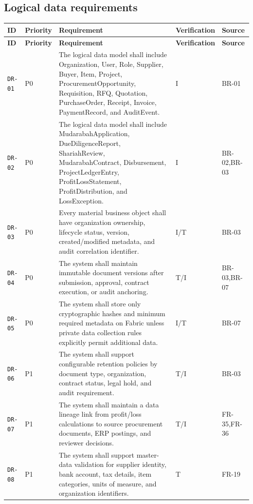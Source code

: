 \documentclass[11pt,a4paper]{article}
\begin{document}
\subsection{Logical data requirements}\label{sec:data}
\begin{footnotesize}
\begin{longtable}{@{}p{}p{}p{}p{}p{}@{}}
\rowcolor{gray!18}\textbf{ID} & \textbf{Priority} & \textbf{Requirement} & \textbf{Verification} & \textbf{Source} \\ \hline
\endfirsthead
\rowcolor{gray!18}\textbf{ID} & \textbf{Priority} & \textbf{Requirement} & \textbf{Verification} & \textbf{Source} \\ \hline
\endhead
\texttt{DR-01} & P0 & The logical data model shall include Organization, User, Role, Supplier, Buyer, Item, Project, ProcurementOpportunity, Requisition, RFQ, Quotation, PurchaseOrder, Receipt, Invoice, PaymentRecord, and AuditEvent. & I & BR-01 \\ \hline
\texttt{DR-02} & P0 & The logical data model shall include MudarabahApplication, DueDiligenceReport, ShariahReview, MudarabahContract, Disbursement, ProjectLedgerEntry, ProfitLossStatement, ProfitDistribution, and LossException. & I & BR-02,BR-03 \\ \hline
\texttt{DR-03} & P0 & Every material business object shall have organization ownership, lifecycle status, version, created/modified metadata, and audit correlation identifier. & I/T & BR-03 \\ \hline
\texttt{DR-04} & P0 & The system shall maintain immutable document versions after submission, approval, contract execution, or audit anchoring. & T/I & BR-03,BR-07 \\ \hline
\texttt{DR-05} & P0 & The system shall store only cryptographic hashes and minimum required metadata on Fabric unless private data collection rules explicitly permit additional data. & I/T & BR-07 \\ \hline
\texttt{DR-06} & P1 & The system shall support configurable retention policies by document type, organization, contract status, legal hold, and audit requirement. & T/I & BR-03 \\ \hline
\texttt{DR-07} & P1 & The system shall maintain a data lineage link from profit/loss calculations to source procurement documents, ERP postings, and reviewer decisions. & T/I & FR-35,FR-36 \\ \hline
\texttt{DR-08} & P1 & The system shall support master-data validation for supplier identity, bank account, tax details, item categories, units of measure, and organization identifiers. & T & FR-19 \\ \hline

\end{longtable}
\end{footnotesize}
\end{document}

